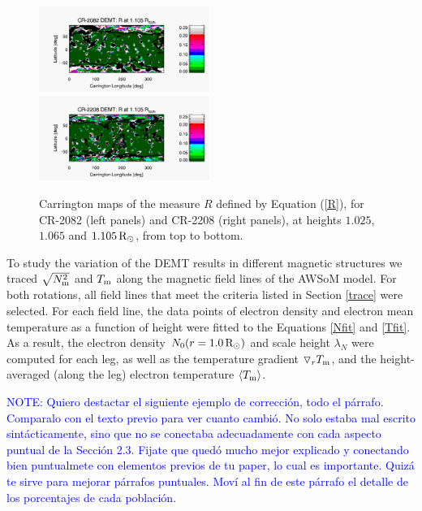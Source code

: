 \documentclass[namedreferences]{solarphysics}
\newcommand{\mrsun}{{\rm R_\odot}}
\newcommand{\lN}{\lambda_N}
\newcommand{\dr}{\triangledown_r}
\newcommand{\Tm}{T_{\rm m}}
\newcommand{\aTm}{\left<\Tm\right>}
\newcommand{\Nsqm}{N^2_{{\rm m}}}
\newcommand{\sqravgN}{\sqrt{\Nsqm}}
\def\notebyalbert#1{\textcolor{blue}{NOTE: #1}}
\begin{document}
\begin{article}
\begin{figure}[h!]
\begin{center}
\includegraphics[width=0.495\textwidth]{figs/map_R_CR2082_DEMT-EUVI_behind_H1-L3523_r3d_1105_Rsun.pdf}
\includegraphics[width=0.495\textwidth]{figs/map_R_CR2208_DEMT-AIA_H1_L522_r3d_1105_Rsun.pdf}
\caption{{Carrington maps of the measure $R$ defined by Equation (\ref{R}), for CR-2082 (left panels) and CR-2208 (right panels), at heights $1.025$, $1.065$ and $1.105\,\mrsun$, from top to bottom}. }
\label{carmaps_R_2082_2208}
\end{center}
\end{figure}

{To study the variation of the DEMT results in different magnetic structures we traced $\sqravgN$ and $\Tm$ along the magnetic field lines of the AWSoM model.} For both rotations, all field lines that meet the criteria listed in Section \ref{trace} were selected. For each field line, the data points of electron density and electron mean temperature as a function of height were fitted to the Equations \ref{Nfit} and \ref{Tfit}. {As a result, the electron density $N_0(r=1.0\,\mrsun)$ and scale height $\lN$ were computed for each leg, as well as the temperature gradient $\dr\Tm$, and the height-averaged (along the leg) {electron temperature} $\aTm$.}

\noindent\notebyalbert{Quiero destactar el siguiente ejemplo de corrección, todo el párrafo. Comparalo con el texto previo para ver cuanto cambió. No solo estaba mal escrito sintácticamente, sino que no se conectaba adecuadamente con cada aspecto puntual de la Sección 2.3. Fijate que quedó mucho mejor explicado y conectando bien puntualmete con elementos previos de tu paper, lo cual es importante. Quizá te sirve para mejorar párrafos puntuales. Moví al fin de este párrafo el detalle de los porcentajes de cada población.}


\end{article}
\end{document}
